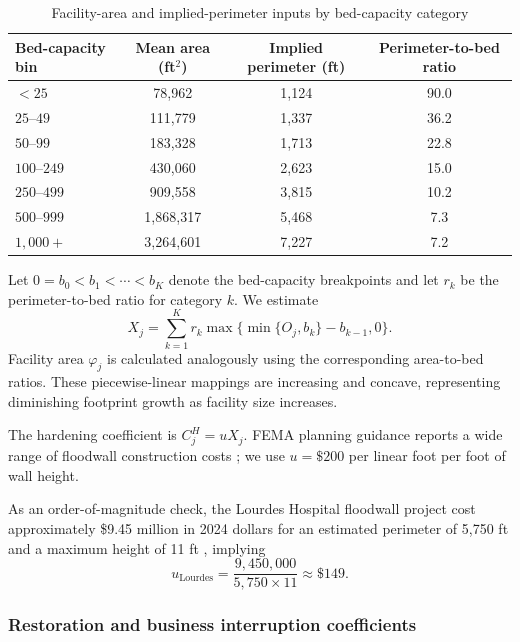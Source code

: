 \documentclass[preprint,11pt,authoryear]{elsarticle}
\begin{document}
\begin{table}[!t]
\centering
\caption{Facility-area and implied-perimeter inputs by bed-capacity category}
\label{tab:supp_perimeter_from_area}
\small
\begin{tabular}{lccc}
\toprule
Bed-capacity bin
& Mean area (ft$^2$)
& Implied perimeter (ft)
& Perimeter-to-bed ratio \\
\midrule
$<25$        & 78,962      & 1,124 & 90.0 \\
$25$--$49$   & 111,779     & 1,337 & 36.2 \\
$50$--$99$   & 183,328     & 1,713 & 22.8 \\
$100$--$249$ & 430,060     & 2,623 & 15.0 \\
$250$--$499$ & 909,558     & 3,815 & 10.2 \\
$500$--$999$ & 1,868,317   & 5,468 & 7.3 \\
$1,000+$     & 3,264,601   & 7,227 & 7.2 \\
\bottomrule
\end{tabular}
\end{table}

Let $0=b_0<b_1<\cdots<b_K$ denote the bed-capacity breakpoints and let
$r_k$ be the perimeter-to-bed ratio for category $k$. We estimate
\[
X_j
=
\sum_{k=1}^{K}
r_k
\max\{\min\{O_j,b_k\}-b_{k-1},0\}.
\]
Facility area $\varphi_j$ is calculated analogously using the corresponding
area-to-bed ratios. These piecewise-linear mappings are increasing and
concave, representing diminishing footprint growth as facility size
increases.

The hardening coefficient is $C_j^H=uX_j$. FEMA planning guidance reports a
wide range of floodwall construction costs
\citep{SCCOG_critical_facilities}; we use
$u=\$200$ per linear foot per foot of wall height.

As an order-of-magnitude check, the Lourdes Hospital floodwall project cost
approximately \$9.45 million in 2024 dollars for an estimated perimeter of
5,750 ft and a maximum height of 11 ft
\citep{fema_advanced_2012}, implying
\[
u_{\mathrm{Lourdes}}
=
\frac{9{,}450{,}000}{5{,}750\times11}
\approx \$149.
\]

\subsubsection{Restoration and business interruption coefficients}
\label{sec:supp_restoration_cost}
\end{document}

